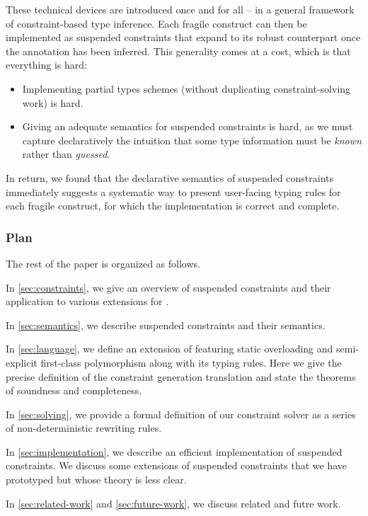 \documentclass[acmsmall,screen,nonacm]{acmart}
\begin{document}
These technical devices are introduced once and for all -- in a general
framework of constraint-based type inference. Each fragile \ML construct can
then be implemented as suspended constraints that expand to its robust
counterpart once the annotation has been inferred. This generality comes at
a cost, which is that everything is hard:
\begin{itemize}
\item Implementing partial types schemes (without duplicating
  constraint-solving work) is hard.
\item Giving an adequate semantics for suspended constraints is hard, as we
  must capture declaratively the intuition that some type information must be
  \emph{known} rather than \emph{guessed}.
\end{itemize}
In return, we found that the declarative semantics of suspended constraints
immediately suggests a systematic way to present user-facing typing rules
for each fragile construct, for which the implementation is correct and
complete.

\subsubsection* {Plan}

The rest of the paper is organized as follows.
\begin{enumerate*}[label={}]
\item
  In \cref{sec:constraints}, we give an overview of suspended constraints
  and their application to various extensions for \ML.
\item
  In \cref{sec:semantics}, we describe suspended constraints and their semantics.
\item
  In \cref{sec:language}, we define an extension of \ML featuring static
  overloading and semi-explicit first-class polymorphism along with its
  typing rules. Here we give the precise definition of the constraint
  generation translation and state the theorems of soundness and
  completeness.
\item
  In \cref{sec:solving}, we provide a formal definition of our constraint
  solver as a series of non-deterministic rewriting rules.
\item In \cref{sec:implementation}, we describe an efficient implementation
  of suspended constraints. We discuss some extensions of suspended
  constraints that we have prototyped but whose theory is less clear.
\item
  In \cref{sec:related-work} and \cref{sec:future-work}, we discuss related
  and futre work.
\end{enumerate*}
\end{document}
